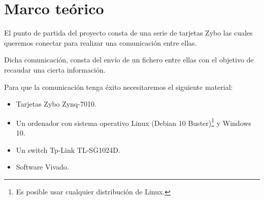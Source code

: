 \section{Marco teórico}
El punto de partida del proyecto consta de una serie de tarjetas Zybo las cuales queremos conectar para realizar una comunicación entre ellas.

Dicha comunicación, consta del envío de un fichero entre ellas con el objetivo de recaudar una cierta información.

Para que la comunicación tenga éxito necesitaremos el siguiente material:
\begin{itemize}
	\item Tarjetas Zybo Zynq-7010.
	\item Un ordenador con sistema operativo Linux (Debian 10 Buster)\footnote{Es posible usar cualquier distribución de Linux.} y Windows 10.
	\item Un switch Tp-Link TL-SG1024D.
	\item Software Vivado.
\end{itemize}